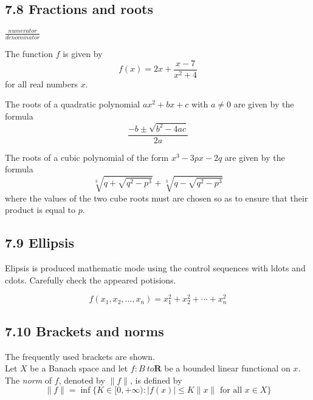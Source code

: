 \documentclass{article} %
\begin{document}


\subsection*{7.8 Fractions and roots}

$\frac{numerator}{denominator}$


The function $f$ is given by
\[
f(x) = 2x + \frac{x-7}{x^2 + 4}
\]
for all real numbers $x$.


The roots of a quadratic polynomial $a x^2 + bx + c$ with
$a \neq 0$ are given by the formula
\[
\frac{-b \pm \sqrt{b^2 - 4ac}}{2a}
\]


The roots of a cubic polynomial of the form $x^3 - 3px -2q$
are given by the formula
\[
\sqrt[3]{q + \sqrt{q^2 - p^3}} + \sqrt[3]{q - \sqrt{q^2 - p^3}}
\]
where the values of the two cube roots must are chosen
so as to ensure that their product is equal to $p$.

\subsection*{7.9 Ellipsis}

Elipsis is produced mathematic mode using the control sequences with ldots and cdots. Carefully check the appeared potisions.


\[
f(x_1, x_2, \ldots, x_n) = x_1^2 + x_2^2 + \cdots + x_n^2 
\]


\subsection*{7.10 Brackets and norms}

The frequently used brackets are shown.\\

Let $X$ be a Banach space and let $f \colon B \ to \textbf{R}$
be a bounded linear functional on $x$. The \textit{norm} of
$f$, denoted by $\|f\|$, is defined by
\[
\|f\| = \inf \{K \in [0, +\infty) :
|f(x)| \leq K \|x\| \mbox{ for all } x \in X \}
\]
\end{document}
